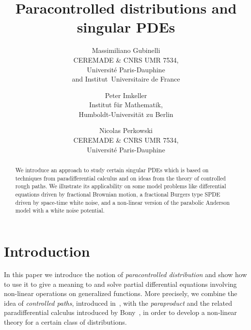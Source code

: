 \documentclass[a4paper,11pt]{article}
\newcommand{\TeXmacs}{T\kern-.1667em\lower.5ex\hbox{E}\kern-.125emX\kern-.1em\lower.5ex\hbox{\textsc{m\kern-.05ema\kern-.125emc\kern-.05ems}}}
\newcommand{\tmnote}[1]{\thanks{\textit{Note:} #1}}
\newcommand{\tmsep}{, }
\newcommand{\tmkeywords}{\textbf{Keywords:} }
\newcommand{\withTeXmacstext}{This document has been produced using the GNU {\TeXmacs} text editor (see \url{http://www.texmacs.org})}
\theoremstyle{remark}
\begin{document}


\title{Paracontrolled distributions and singular PDEs}%

\author{Massimiliano Gubinelli \\ CEREMADE \& CNRS UMR 7534, \\ Universit{\'e} Paris-Dauphine \\ and Institut~Universitaire de France \and 
Peter Imkeller \\ Institut f\"ur Mathematik, \\ Humboldt-Universit\"at zu Berlin \and
Nicolas Perkowski \\ CEREMADE \& CNRS UMR 7534,\\ Universit{\'e} Paris-Dauphine}

\date{}


\maketitle

\begin{abstract}
   We introduce an approach to study certain singular PDEs which is based on  techniques from paradifferential calculus and on ideas from the theory of controlled rough paths. We illustrate its applicability on some model problems like differential equations driven by fractional Brownian motion, a fractional Burgers type SPDE driven by space-time white noise, and a non-linear version of the parabolic Anderson model with a white noise potential.
\end{abstract}




\section{Introduction}

In this paper we introduce the notion of \emph{paracontrolled distribution} and show how to use it to give a meaning to and solve partial differential equations involving non-linear operations on generalized functions.  More precisely, we combine the idea of \emph{controlled paths}, introduced  in~\cite{Gubinelli2004}, with the \emph{paraproduct} and the related paradifferential calculus introduced by Bony~\cite{Bony1981}, in order to develop a non-linear theory for a certain class of distributions.
\end{document}
